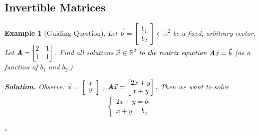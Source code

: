 \documentclass[12pt, a4paper]{article}
\newtheorem{eg}{Example}[subsection]
\newenvironment*{sol}{\indent\textbf{Solution. }}{\hfill{$\square$}\par}
\def\R{{\mathbb{R}}}
\def\vecx{\vec{x}}
\def\vecb{\vec{b}}
\def\matrixA{\textbf{\emph{A}}}
\begin{document}
\subsection{Invertible Matrices}
\begin{eg}[Guiding Question]
	Let $\vecb=\begin{bmatrix}b_1\\b_2\end{bmatrix}\in\R^2$ be a fixed, arbitrary vector. Let $\matrixA=\begin{bmatrix}2&1\\1&1\end{bmatrix}.$ Find all solutions $\vecx\in\R^2$ to the matrix equation $\matrixA\vecx=\vecb$ (as a function of $b_1$ and $b_2.$)
	
	\begin{sol}
		Observe: $\vecx=\begin{bmatrix}x\\y\end{bmatrix}$	, $\matrixA\vecx=\begin{bmatrix}2x+y\\x+y\end{bmatrix}.$ Then we want to solve \[\begin{cases}2x+y=b_1\\x+y=b_2\end{cases}\]

\end{sol}
\end{eg}
\end{document}
